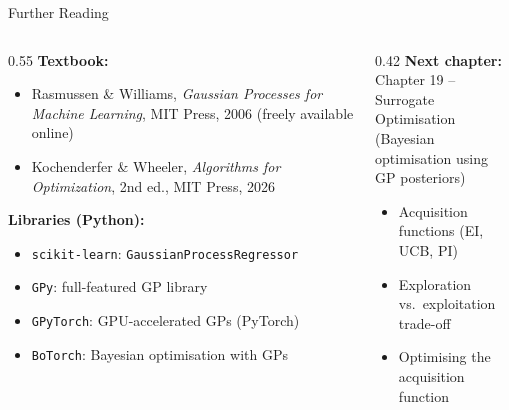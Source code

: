 \documentclass[aspectratio=169,10pt]{beamer}
\begin{document}
\begin{frame}{Further Reading}
  \begin{columns}[T]
    \begin{column}{0.55\textwidth}
      \textbf{Textbook:}
      \begin{itemize}
        \item Rasmussen \& Williams, \emph{Gaussian Processes for Machine
              Learning}, MIT Press, 2006 (freely available online)
        \item Kochenderfer \& Wheeler, \emph{Algorithms for Optimization},
              2nd ed., MIT Press, 2026
      \end{itemize}
      \vspace{0.4em}
      \textbf{Libraries (Python):}
      \begin{itemize}
        \item \texttt{scikit-learn}: \texttt{GaussianProcessRegressor}
        \item \texttt{GPy}: full-featured GP library
        \item \texttt{GPyTorch}: GPU-accelerated GPs (PyTorch)
        \item \texttt{BoTorch}: Bayesian optimisation with GPs
      \end{itemize}
    \end{column}
    \begin{column}{0.42\textwidth}
      \textbf{Next chapter:}\\
      Chapter 19 -- Surrogate Optimisation\\
      (Bayesian optimisation using GP posteriors)
      \vspace{0.5em}
      \begin{itemize}
        \item Acquisition functions (EI, UCB, PI)
        \item Exploration vs.\ exploitation trade-off
        \item Optimising the acquisition function
      \end{itemize}
    \end{column}
  \end{columns}
\end{frame}
\end{document}
